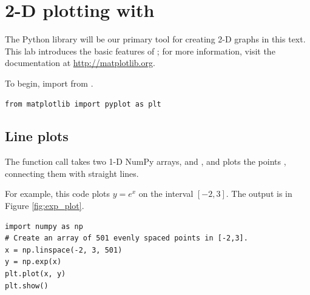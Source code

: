 \label{lab:Matplotlib_and_Mayavi}

\section*{2-D plotting with }
The Python library  will be our primary tool for creating 2-D graphs in this text. This lab introduces the basic features of ; for more information, visit the documentation at \url{http://matplotlib.org}.

To begin, import  from .
\begin{lstlisting}
from matplotlib import pyplot as plt
\end{lstlisting}

\subsection*{Line plots}
The function call  takes two 1-D NumPy arrays,  and , and plots the points , connecting them with straight lines.

For example, this code plots $y=e^x$ on the interval $[-2,3]$. The output is in Figure \ref{fig:exp_plot}.
\begin{lstlisting}
import numpy as np
# Create an array of 501 evenly spaced points in [-2,3].
x = np.linspace(-2, 3, 501)
y = np.exp(x)
plt.plot(x, y)
plt.show()
\end{lstlisting}


